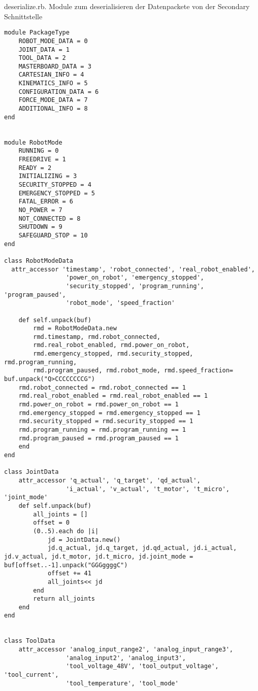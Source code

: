 \documentclass[
a4paper,
12pt,
oneside,
headsepline,		%
footsepline,		%
]{scrbook}
\begin{document}
deserialize.rb. Module zum deserialisieren der Datenpackete von der Secondary Schnittstelle

\begin{lstlisting}
module PackageType
    ROBOT_MODE_DATA = 0
    JOINT_DATA = 1
    TOOL_DATA = 2
    MASTERBOARD_DATA = 3
    CARTESIAN_INFO = 4
    KINEMATICS_INFO = 5
    CONFIGURATION_DATA = 6
    FORCE_MODE_DATA = 7
    ADDITIONAL_INFO = 8
end


module RobotMode
    RUNNING = 0
    FREEDRIVE = 1
    READY = 2
    INITIALIZING = 3
    SECURITY_STOPPED = 4
    EMERGENCY_STOPPED = 5
    FATAL_ERROR = 6
    NO_POWER = 7
    NOT_CONNECTED = 8
    SHUTDOWN = 9
    SAFEGUARD_STOP = 10
end

class RobotModeData
  attr_accessor 'timestamp', 'robot_connected', 'real_robot_enabled',
                 'power_on_robot', 'emergency_stopped',
                 'security_stopped', 'program_running', 'program_paused',
                 'robot_mode', 'speed_fraction'

    def self.unpack(buf)
        rmd = RobotModeData.new
        rmd.timestamp, rmd.robot_connected, 
        rmd.real_robot_enabled, rmd.power_on_robot,
        rmd.emergency_stopped, rmd.security_stopped, rmd.program_running,
        rmd.program_paused, rmd.robot_mode, rmd.speed_fraction= buf.unpack("Q>CCCCCCCCG")
    rmd.robot_connected = rmd.robot_connected == 1
    rmd.real_robot_enabled = rmd.real_robot_enabled == 1
    rmd.power_on_robot = rmd.power_on_robot == 1
    rmd.emergency_stopped = rmd.emergency_stopped == 1
    rmd.security_stopped = rmd.security_stopped == 1
    rmd.program_running = rmd.program_running == 1
    rmd.program_paused = rmd.program_paused == 1
    end
end

class JointData
    attr_accessor 'q_actual', 'q_target', 'qd_actual',
                 'i_actual', 'v_actual', 't_motor', 't_micro', 'joint_mode'
    def self.unpack(buf)
        all_joints = []
        offset = 0
        (0..5).each do |i|
            jd = JointData.new()
            jd.q_actual, jd.q_target, jd.qd_actual, jd.i_actual, jd.v_actual, jd.t_motor, jd.t_micro, jd.joint_mode = buf[offset..-1].unpack("GGGggggC")
            offset += 41
            all_joints<< jd
        end
        return all_joints
    end
end


class ToolData
    attr_accessor 'analog_input_range2', 'analog_input_range3',
                 'analog_input2', 'analog_input3',
                 'tool_voltage_48V', 'tool_output_voltage', 'tool_current',
                 'tool_temperature', 'tool_mode'
    

\end{lstlisting}
\end{document}

